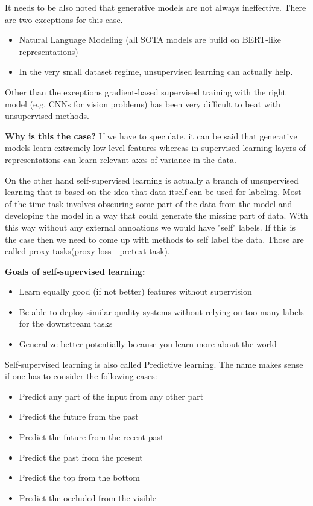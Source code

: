 \documentclass{article}
\begin{document}
It needs to be also noted that generative models are not always ineffective.
There are two exceptions for this case.
 
\begin{itemize}
   \item Natural Language Modeling (all SOTA models are build
   on BERT-like representations)
   \item In the very small dataset regime,
   unsupervised learning can actually help.
\end{itemize}
 
Other than the exceptions gradient-based supervised training with the
right model (e.g. CNNs for vision problems) has been very difficult to beat
with unsupervised methods.
 
\textbf{Why is this the case?}
If we have to speculate, it can be said that generative models
learn extremely low level features whereas in supervised learning
layers of representations can learn relevant axes of variance in the data.
 
\par
On the other hand self-supervised learning is actually a
branch of unsupervised learning that is based on the idea
that data itself can be used for labeling. Most of the time
task involves obscuring some part of the data from the model and
developing the model in a way that could generate the missing part
of data. With this way without any external annoations we would have
"self" labels. If this is the case then we need to come up with
methods to self label the data. Those are called proxy tasks(proxy loss
- pretext task).
 
\textbf{Goals of self-supervised learning:}
 
\begin{itemize}
   \item Learn equally good (if not better) features without supervision
   \item Be able to deploy similar quality systems without relying on too many labels for the downstream tasks
   \item Generalize better potentially because you learn more about the world
\end{itemize}
 
Self-supervised learning is also called Predictive learning.
The name makes sense if one has to consider the following cases:
 
\begin{itemize}
   \item Predict any part of the input from any other part
   \item Predict the future from the past
   \item Predict the future from the recent past
   \item Predict the past from the present
   \item Predict the top from the bottom
   \item Predict the occluded from the visible
\end{itemize}
 
\end{document}
